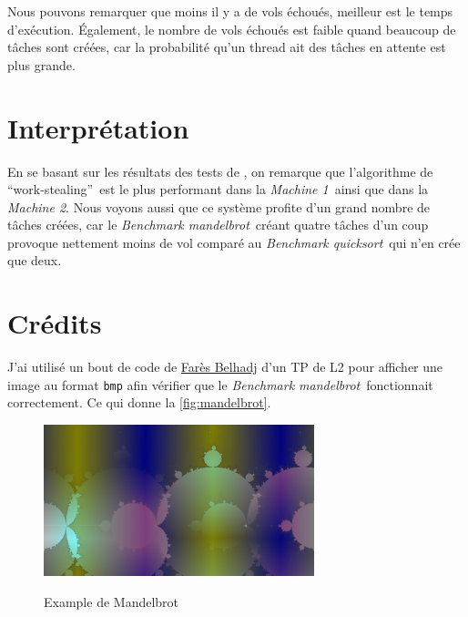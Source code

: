 \documentclass[a4paper]{article}
\def\mone{\textit{Machine 1}} %
\def\mtwo{\textit{Machine 2}} %
\def\bone{\textit{Benchmark quicksort}}
\def\btwo{\textit{Benchmark mandelbrot}}
\def\ws{\enquote{work-stealing}}
\newcommand{\docref}[1]{\textit{\nameref{#1}}} %
\begin{document}
Nous pouvons remarquer que moins il y a de vols échoués,
meilleur est le temps d'exécution. Également, le nombre de vols échoués est
faible quand beaucoup de tâches sont créées, car la probabilité qu'un thread ait
des tâches en attente est plus grande.


\section{Interprétation}
En se basant sur les résultats des tests de \docref{sec:stats}, on remarque
que l'algorithme de \ws~est le plus performant dans la \mone~ainsi que dans
la \mtwo. Nous voyons aussi que ce système profite d'un grand nombre de
tâches créées, car le \btwo~créant quatre tâches d'un coup provoque nettement
moins de vol comparé au \bone~qui n'en crée que deux.

\clearpage
\appendix
\section{Crédits}

J'ai utilisé un bout de code de \href{https://expreg.org/amsi/C/}{Farès Belhadj}
d'un TP de L2 pour afficher une image au format \texttt{bmp} afin vérifier que
le \btwo~fonctionnait correctement. Ce qui donne la \autoref{fig:mandelbrot}.

\begin{figure}[h!]
  \centering
  \includegraphics[alt={Fractale mandelbrot},width=0.7\textwidth]{imgs/mandelbrot.jpg}
  \caption{Example de Mandelbrot}
  \label{fig:mandelbrot}
\end{figure}
\end{document}
